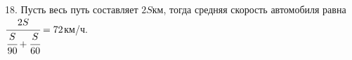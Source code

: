 18. Пусть весь путь составляет $2S$км, тогда средняя скорость автомобиля равна $\cfrac{2S}{\cfrac{S}{90}+\cfrac{S}{60}}=72$км/ч.\\
